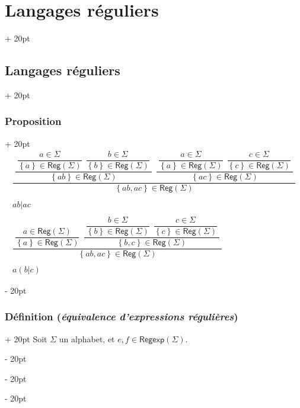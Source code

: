\documentclass[a4paper, 12pt, twoside]{article}
\newcommand{\set}[1]{\left\{ #1 \right\}}
\newcommand{\ind}[1][20pt]{\advance\leftskip + #1}
\newcommand{\deind}[1][20pt]{\advance\leftskip - #1}
\newenvironment{indt}[2][20pt]{#2 \par \ind[#1]}{\par \deind} %
\newcommand{\Reg}{\mathsf{Reg}}
\newcommand{\Regexp}{\mathsf{Regexp}}
\begin{document}
\begin{indt}{\section{Langages réguliers}}
\begin{indt}{\subsection{Langages réguliers}}
\begin{indt}{\subsubsection{Proposition}}
                \[
                    \begin{array}{c}
                        \dfrac{
                            ~\dfrac{
                                ~\dfrac{a \in \Sigma}{\set a \in \Reg(\Sigma)}
                                \ \
                                \dfrac{b \in \Sigma}{\set b \in \Reg(\Sigma)}~
                            }{
                                \set{ab} \in \Reg(\Sigma)
                            }
                            \ \
                            \dfrac{
                                ~\dfrac{a \in \Sigma}{\set a \in \Reg(\Sigma)}
                                \ \
                                \dfrac{c \in \Sigma}{\set c \in \Reg(\Sigma)}~
                            }{
                                \set{ac} \in \Reg(\Sigma)
                            }~
                        }{
                            \set{ab, ac} \in \Reg(\Sigma) %
                        }
                        \\
                        \\
                        ab | ac
                        \\\\
                        \dfrac{
                            ~\dfrac{
                                a \in \Reg(\Sigma)
                            }{
                                \set a \in \Reg(\Sigma)
                            }
                            \ \
                            \dfrac{
                                ~\dfrac{b \in \Sigma}{\set b \in \Reg(\Sigma)}
                                \ \
                                \dfrac{c \in \Sigma}{\set c \in \Reg(\Sigma)}~
                            }{
                                \set{b, c} \in \Reg(\Sigma)
                            }~
                        }{
                            \set{ab, ac} \in \Reg(\Sigma)
                        }
                        \\
                        \\
                        a(b|c)
                    \end{array}
                \]
            \end{indt}

            \vspace{12pt}
            
            \begin{indt}{\subsubsection{Définition (\textit{équivalence d'expressions régulières})}}
                Soit $\Sigma$ un alphabet, et $e, f \in \Regexp(\Sigma)$.


\end{indt}
\end{indt}
\end{indt}
\end{document}
